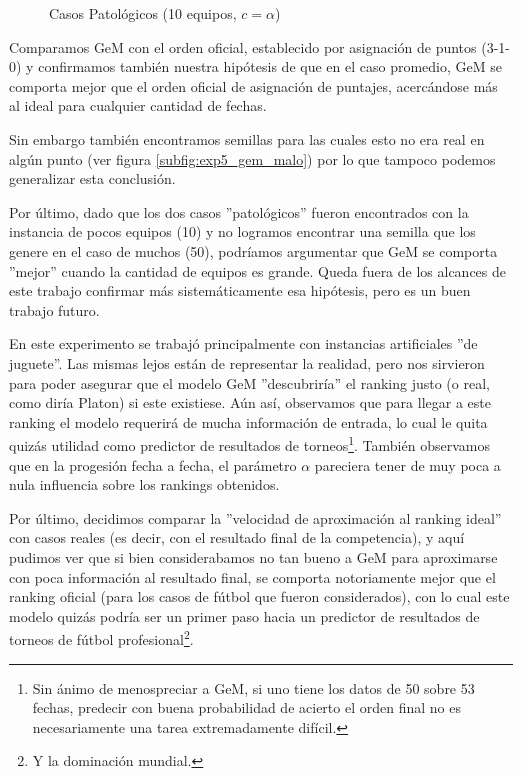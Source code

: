 \begin{figure}[H]
    \caption{Casos Patol\'ogicos (10 equipos, $c = \alpha$)}
    \label{fig:exp5_2}
    \centering
\end{figure}

\par Comparamos GeM con el orden oficial, establecido por asignación de puntos
(3-1-0) y confirmamos tambi\'en nuestra hip\'otesis de que en el caso promedio,
GeM se comporta mejor que el orden oficial de asignaci\'on de puntajes,
acerc\'andose más al ideal para cualquier cantidad de fechas.

\par Sin embargo tambi\'en encontramos semillas para las cuales esto no era real
en alg\'un punto (ver figura \ref{subfig:exp5_gem_malo}) por lo que tampoco
podemos generalizar esta conclusi\'on.

\par Por \'ultimo, dado que los dos casos ''patol\'ogicos'' fueron encontrados
con la instancia de pocos equipos (10) y no logramos encontrar una semilla que
los genere en el caso de muchos (50), podr\'iamos argumentar que GeM se comporta
''mejor'' cuando la cantidad de equipos es grande. Queda fuera de los alcances
de este trabajo confirmar m\'as sistem\'aticamente esa hip\'otesis, pero es un
buen trabajo futuro.

\medskip
\par En este experimento se trabaj\'o principalmente con instancias artificiales
''de juguete''. Las mismas lejos est\'an de representar la realidad, pero nos
sirvieron para poder asegurar que el modelo GeM ''descubrir\'ia'' el ranking
justo (o real, como dir\'ia Platon) si este existiese. A\'un as\'i, observamos
que para llegar a este ranking el modelo requerir\'a de mucha informaci\'on de
entrada, lo cual le quita quiz\'as utilidad como predictor de resultados de
torneos\footnote{Sin \'animo de menospreciar a GeM, si uno tiene los datos de 50
sobre 53 fechas, predecir con buena probabilidad de acierto el orden final no es
necesariamente una tarea extremadamente dif\'icil.}. Tambi\'en observamos que en
la progesi\'on fecha a fecha, el par\'ametro $\alpha$ pareciera tener de muy
poca a nula influencia sobre los rankings obtenidos.

\par Por \'ultimo, decidimos
comparar la ''velocidad de aproximaci\'on al ranking ideal'' con casos reales (es
decir, con el resultado final de la competencia), y aqu\'i pudimos ver que si
bien considerabamos no tan bueno a GeM para aproximarse con poca informaci\'on
al resultado final, se comporta notoriamente mejor que el ranking oficial (para
los casos de f\'utbol que fueron considerados), con lo cual este modelo quiz\'as
podr\'ia ser un primer paso hacia un predictor de resultados de torneos de
f\'utbol profesional\footnote{Y la dominaci\'on mundial.}.
